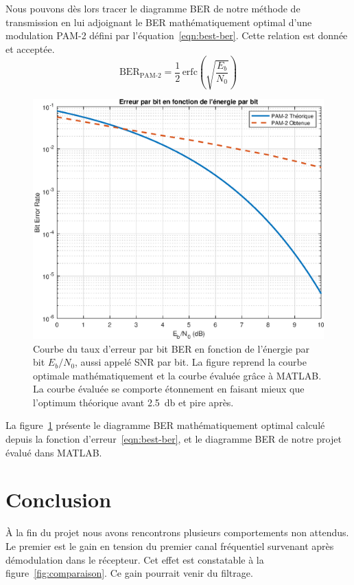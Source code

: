 \documentclass[10pt, oneside, a4paper]{article}
\begin{document}
Nous pouvons dès lors tracer le diagramme BER de notre méthode de transmission en lui adjoignant le BER mathématiquement optimal d'une modulation PAM-2 défini par l'équation~\ref{eqn:best-ber}. Cette relation est donnée et acceptée.
\begin{equation}
    \text{BER}_\text{PAM-2} = \frac{1}{2}\,\text{erfc}\left(\sqrt{\frac{E_b}{N_0}}\right)
    \label{eqn:best-ber}
\end{equation}
\begin{figure}[!ht]
    \centering
    \includegraphics[height=0.4\textheight]{eps/ber-curve.eps}
    \caption{Courbe du taux d'erreur par bit BER en fonction de l'énergie par bit
             $E_b/N_0$, aussi appelé SNR par bit.
             La figure reprend la courbe optimale mathématiquement et la courbe évaluée
             grâce à MATLAB. La courbe évaluée se comporte étonnement en faisant mieux
             que l'optimum théorique avant \SI{2.5}{\decibel} et pire après.}
    \label{fig:ber-curve}
\end{figure}
La figure~\ref{fig:ber-curve} présente le diagramme BER mathématiquement optimal calculé depuis la fonction d'erreur~\ref{eqn:best-ber}, et le diagramme BER de notre projet évalué dans MATLAB.

\section*{Conclusion}
À la fin du projet nous avons rencontrons plusieurs comportements non attendus.
Le premier est le gain en tension du premier canal fréquentiel survenant après démodulation dans le récepteur.
Cet effet est constatable à la figure~\ref{fig:comparaison}.
Ce gain pourrait venir du filtrage.
\end{document}
